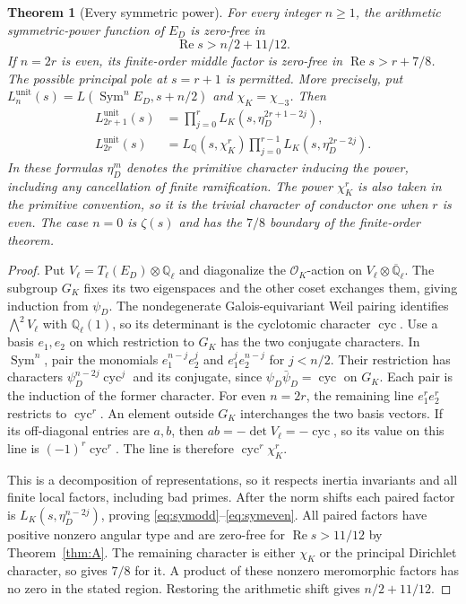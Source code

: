 \documentclass[11pt,a4paper]{article}
\numberwithin{equation}{section}
\newtheorem{theorem}{Theorem}[section]
\theoremstyle{definition}
\theoremstyle{remark}
\newcommand{\Q}{\mathbb Q}
\newcommand{\OO}{\mathcal O}
\newcommand{\Rea}{\operatorname{Re}}
\begin{document}
\begin{theorem}[Every symmetric power]\label{thm:sym}
For every integer $n\ge1$, the arithmetic symmetric-power function of $E_D$ is zero-free in
\[
 \Rea s>n/2+11/12.
\]
If $n=2r$ is even, its finite-order middle factor is zero-free in $\Rea s>r+7/8$. The possible principal pole at $s=r+1$ is permitted. More precisely, put $L_n^{\mathrm{unit}}(s)=L(\operatorname{Sym}^nE_D,s+n/2)$ and $\chi_K=\chi_{-3}$. Then
\begin{align}\label{eq:symodd}
 L_{2r+1}^{\mathrm{unit}}(s)
 &=\prod_{j=0}^{r}L_K(s,\eta_D^{2r+1-2j}),\\
 L_{2r}^{\mathrm{unit}}(s)
 &=L_\Q(s,\chi_K^r)\prod_{j=0}^{r-1}L_K(s,\eta_D^{2r-2j}).\label{eq:symeven}
\end{align}
In these formulas $\eta_D^m$ denotes the primitive character inducing the power, including any cancellation of finite ramification. The power $\chi_K^r$ is also taken in the primitive convention, so it is the trivial character of conductor one when $r$ is even. The case $n=0$ is $\zeta(s)$ and has the $7/8$ boundary of the finite-order theorem.
\end{theorem}
\begin{proof}
Put $V_\ell=T_\ell(E_D)\otimes\Q_\ell$ and diagonalize the $\OO_K$-action on $V_\ell\otimes\overline{\Q}_\ell$. The subgroup $G_K$ fixes its two eigenspaces and the other coset exchanges them, giving induction from $\psi_D$. The nondegenerate Galois-equivariant Weil pairing identifies $\bigwedge^2V_\ell$ with $\Q_\ell(1)$, so its determinant is the cyclotomic character $\operatorname{cyc}$. Use a basis $e_1,e_2$ on which restriction to $G_K$ has the two conjugate characters. In $\operatorname{Sym}^n$, pair the monomials $e_1^{n-j}e_2^j$ and $e_1^je_2^{n-j}$ for $j<n/2$. Their restriction has characters $\psi_D^{n-2j}\operatorname{cyc}^j$ and its conjugate, since $\psi_D\bar\psi_D=\operatorname{cyc}$ on $G_K$. Each pair is the induction of the former character. For even $n=2r$, the remaining line $e_1^re_2^r$ restricts to $\operatorname{cyc}^r$. An element outside $G_K$ interchanges the two basis vectors. If its off-diagonal entries are $a,b$, then $ab=-\det V_\ell=-\operatorname{cyc}$, so its value on this line is $(-1)^r\operatorname{cyc}^r$. The line is therefore $\operatorname{cyc}^r\chi_K^r$.

This is a decomposition of representations, so it respects inertia invariants and all finite local factors, including bad primes. After the norm shifts each paired factor is $L_K(s,\eta_D^{n-2j})$, proving \eqref{eq:symodd}--\eqref{eq:symeven}. All paired factors have positive nonzero angular type and are zero-free for $\Rea s>11/12$ by Theorem~\ref{thm:A}. The remaining character is either $\chi_K$ or the principal Dirichlet character, so \cite[Theorem 1.1]{QRH78} gives $7/8$ for it. A product of these nonzero meromorphic factors has no zero in the stated region. Restoring the arithmetic shift gives $n/2+11/12$.
\end{proof}
\end{document}
